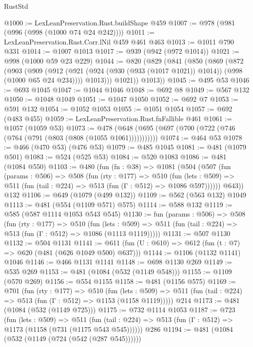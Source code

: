 \begin{lexlean}{RustStd}
\begin{coremodule}
{\begin{coremodule}
{{{{{{{@1000 := LexLeanPreservation.Rust.buildShape @459
@1007 := @978 (@981 (@996 (@998 (@1000 @74 @24 @242))))
@1011 := LexLeanPreservation.Rust.Corr.lNil @459 @461 @463
@1013 := @1011 @790 @331
@1014 := @1007 @1013
@1017 := @939 (@942 (@972 @1014))
@1021 := @998 (@1000 @59 @23 @229)
@1044 := @820
    (@829
      (@841
        (@850
          (@869
            (@872
              (@903
                (@909
                  (@912 (@921 (@924 (@930 (@933 (@1017 @1021)) @1014)) (@998 (@1000 @65 @24 @234))))
                  @1013)))
            @1021))
        @1013))
@1045 := @495 @53
@1046 := @693 @1045
@1047 := @1044 @1046
@1048 := @692 @8
@1049 := @567 @132
@1050 := @1048 @1049
@1051 := @1047 @1050
@1052 := @692 @7
@1053 := @591 @132
@1054 := @1052 @1053
@1055 := @1051 @1054
@1057 := @692 (@483 @455)
@1059 := LexLeanPreservation.Rust.fnFallible @461
@1061 := @1057 (@1059 @53)
@1073 := @478 (@648 (@695 (@697 (@700 (@722 (@746 (@764 (@791 (@803 (@808 (@1055 @1061)))))))))))
@1074 := @464 @53
@1078 := @466 (@470 @53) (@476 @53)
@1079 := @485 @1045
@1081 := @481 (@1079 @501)
@1083 := @524 (@525 @53)
@1084 := @520 @1083
@1086 := @481 (@1084 @550)
@1103 := @480
    (fun (fn : @38) =>
    @1081
      (@504
        (@507
          (fun (params : @506) =>
          @508
            (fun (rty : @177) =>
            @510
              (fun (lets : @509) =>
              @511 (fun (tail : @224) => @513 (fun (Γ : @512) => @1086 @597))))))
        @643))
    @132
@1106 := @649 (@1079 (@499 @132))
@1109 := @562 (@563 @132) @1049
@1113 := @481 (@554 (@1109 @571) @575)
@1114 := @588 @132
@1119 := @585 (@587 @1114 @1053 @543 @545)
@1130 := fun (params : @506) =>
  @508
    (fun (rty : @177) =>
    @510
      (fun (lets : @509) =>
      @511 (fun (tail : @224) => @513 (fun (Γ : @512) => @1086 (@1113 @1119)))))
@1131 := @507 @1130
@1132 := @504 @1131
@1141 := @611 (fun (U : @610) => @612 (fun (t : @7) => @620 (@481 (@626 @1049 @500) @637)))
@1144 := @1106 (@1132 @1141) @1046
@1146 := @466 @1131 @1141
@1148 := @698 @1130 @269
@1149 := @535 @269
@1153 := @481 (@1084 (@532 (@1149 @548)))
@1155 := @1109 (@570 @269)
@1156 := @554 @1155
@1158 := @481 (@1156 @575)
@1169 := @701
    (fun (rty : @177) =>
    @510
      (fun (lets : @509) =>
      @511 (fun (tail : @224) => @513 (fun (Γ : @512) => @1153 (@1158 @1119)))))
    @214
@1173 := @481 (@1084 (@532 (@1149 @725)))
@1175 := @732 @1114 @1053
@1187 := @723
    (fun (lets : @509) =>
    @511 (fun (tail : @224) => @513 (fun (Γ : @512) => @1173 (@1158 (@731 (@1175 @543 @545))))))
    @286
@1194 := @481 (@1084 (@532 (@1149 (@724 (@542 (@287 @545))))))
}}}}}}}
\end{coremodule}}
\end{coremodule}
\end{lexlean}
